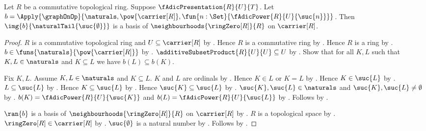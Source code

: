 \begin{theorem}\label{f_adic_presentation_tail_basis}
    Let $R$ be a commutative topological ring.
    Suppose $\fAdicPresentation{R}{U}{T}$.
    Let $b=\Apply{\graphOnOp}{
        \naturals,\pow{\carrier[R]},
        \fun{n:\Set}{\fAdicPower{R}{U}{\suc{n}}}}$.
    Then $\img{b}{\naturalTail{\suc{\emptyset}}}$ is a basis of
        $\neighbourhoods{\ringZero[R]}{R}$ on $\carrier[R]$.
\end{theorem}
\begin{proof}
    $R$ is a commutative topological ring and
        $U\subseteq\carrier[R]$ by .
    Hence $R$ is a commutative ring by
        .
    Hence $R$ is a ring by .
    $b\in\funs{\naturals}{\pow{\carrier[R]}}$ by
        .
    $\additiveSubsetProduct{R}{U}{U}\subseteq U$ by
        .
    Show that for all $K,L$ such that $K,L\in\naturals$ and
        $K\subseteq L$ we have $b(L)\subseteq b(K)$.
    \begin{subproof}
        Fix $K,L$.
        Assume $K,L\in\naturals$ and $K\subseteq L$.
        $K$ and $L$ are ordinals by .
        Hence $K\in L$ or $K=L$ by
            .
        Hence $K\in\suc{L}$ by .
        $L\subseteq\suc{L}$ by .
        Hence $K\subseteq\suc{L}$ by
            .
        Hence $\suc{K}\subseteq\suc{L}$ by .
        $\suc{K},\suc{L}\in\naturals$ and
            $\suc{K},\suc{L}\neq\emptyset$ by
            .
        $b(K)=\fAdicPower{R}{U}{\suc{K}}$ and
            $b(L)=\fAdicPower{R}{U}{\suc{L}}$ by
            .
        Follows by .
    \end{subproof}
    $\ran{b}$ is a basis of $\neighbourhoods{\ringZero[R]}{R}$ on
        $\carrier[R]$ by
        .
    $R$ is a topological space by
        .
    $\ringZero[R]\in\carrier[R]$ by .
    $\suc{\emptyset}$ is a natural number by
        .
    Follows by
        .
\end{proof}

